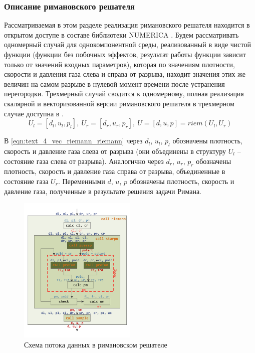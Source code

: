 \subsubsection{Описание римановского решателя}

Рассматриваемая в этом разделе реализация римановского решателя находится в открытом доступе в составе библиотеки NUMERICA \cite{numericaGithub}.
Будем рассматривать одномерный случай для однокомпонентной среды, реализованный в виде чистой функции (функции без побочных эффектов, результат работы функции зависит только от значений входных параметров), которая по значениям плотности, скорости и давления газа слева и справа от разрыва, находит значения этих же величин на самом разрыве в нулевой момент времени после устранения перегородки.
Трехмерный случай сводится к одномерному, полная реализация скалярной и векторизованной версии римановского решателя в трехмерном случае доступна в \cite{riemannvecGithub}.
\begin{equation}\label{eqn:text_4_vec_riemann_riemann}
U_l = [d_l, u_l, p_l], \ U_r = [d_r, u_r, p_r], \ U = [d, u, p] = riem(U_l, U_r)
\end{equation}

В \eqref{eqn:text_4_vec_riemann_riemann} через $d_l$, $u_l$, $p_l$ обозначены плотность, скорость и давление газа слева от разрыва (они объединены в структуру  $U_l$ -- состояние газа слева от разрыва).
Аналогично через $d_r$, $u_r$, $p_r$ обозначены плотность, скорость и давление газа справа от разрыва, объединенные в состояние газа $U_r$.
Переменными $d$, $u$, $p$ обозначены плотность, скорость и давление газа, полученные в результате решения задачи Римана.

\begin{figure}[ht]
\centering
\includegraphics[width=0.5\textwidth]{pics/text_4_vec_riemann/pic_functions.pdf}
\singlespacing
{}\caption{Схема потока данных в римановском решателе}
\label{fig:text_4_vec_riem_functions}
\end{figure}

